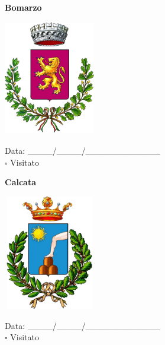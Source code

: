 \documentclass[a5paper,12pt]{article}
\begin{document}
\newpage

\noindent
\begin{minipage}[t]{0.45\textwidth}
    \begin{center}
        \textbf{Bomarzo}
    \end{center}
    \vspace{-0.5cm} %
    \begin{center}
        \includegraphics[height= 5cm, width=4cm]{Lazio/Stemma Bomarzo.png}
    \end{center}
    \vspace{-0.4cm} %
    \begin{flushleft}
        Data: \_\_\_\_/\_\_\_\_/\_\_\_\_\_\_\_\_\_\_\_\_ \\
        $\square$ Visitato
    \end{flushleft}
\end{minipage}
\hfill
\noindent
\begin{minipage}[t]{0.45\textwidth}
    \begin{center}
        \textbf{Calcata}
    \end{center}
    \vspace{-0.5cm} %
    \begin{center}
        \includegraphics[height= 5cm, width=4cm]{Lazio/Stemma Calcata.png}
    \end{center}
    \vspace{-0.4cm} %
    \begin{flushleft}
        Data: \_\_\_\_/\_\_\_\_/\_\_\_\_\_\_\_\_\_\_\_\_ \\
        $\square$ Visitato
    \end{flushleft}
\end{minipage}
\end{document}

